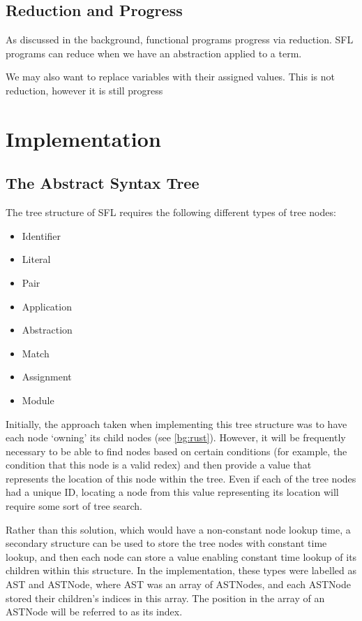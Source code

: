 \subsection{Reduction and Progress}
\label{c1_design_reduction_progress}
As discussed in the background, functional programs progress via reduction. \ac{SFL}  programs can reduce when we have an abstraction applied to a term. 

We may also want to replace variables with their assigned values. This is not reduction, however it is still progress


\section{Implementation}
\subsection{The Abstract Syntax Tree}
The tree structure of \ac{SFL} requires the following different types of tree nodes:
\begin{itemize}
    \item Identifier
    \item Literal
    \item Pair
    \item Application
    \item Abstraction
    \item Match
    \item Assignment
    \item Module
\end{itemize}

Initially, the approach taken when implementing this tree structure was to have each node `owning' its child nodes (see \ref{bg:rust}). However, it will be frequently necessary to be able to find nodes based on certain conditions (for example, the condition that this node is a valid redex) and then provide a value that represents the location of this node within the tree. Even if each of the tree nodes had a unique ID, locating a node from this value representing its location will require some sort of tree search.

Rather than this solution, which would have a non-constant node lookup time, a secondary structure can be used to store the tree nodes with constant time lookup, and then each node can store a value enabling constant time lookup of its children within this structure. In the implementation, these types were labelled as \ac{AST} and ASTNode, where \ac{AST} was an array of ASTNodes, and each ASTNode stored their children's indices in this array. The position in the array of an ASTNode will be referred to as its index.

